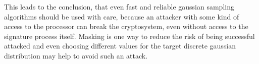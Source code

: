 This leads to the conclusion, that even fast and reliable gaussian sampling algorithms should be used with care, because an attacker with some kind of access to the processor can break the cryptosystem, even without access to the signature process itself. Masking is one way to reduce the risk of being successful attacked and even choosing different values for the target discrete gaussian distribution may help to avoid such an attack. 